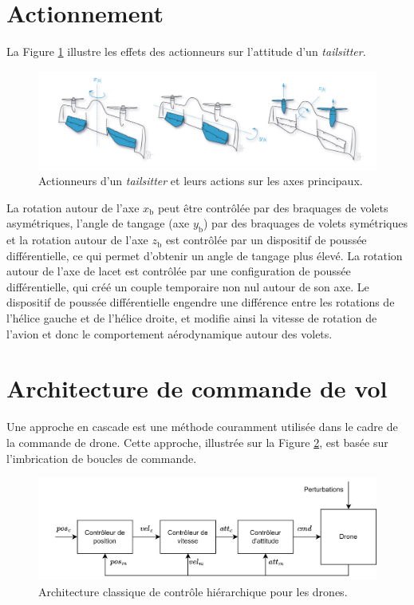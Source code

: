 \section{Actionnement}

La Figure \ref{fig:actionDarko} illustre les effets des actionneurs sur l'attitude d'un \textit{tailsitter}.
\begin{figure}[ht!]
    \centerline{
    \includegraphics[trim=0cm 0cm 0cm 0cm,clip,width=1\columnwidth]{figures/actionnement.png}}
    \caption{Actionneurs d'un \textit{tailsitter} et leurs actions sur les axes principaux.}
    \label{fig:actionDarko}
\end{figure}

La rotation autour de l'axe $x_{\text{b}}$ peut être contrôlée par des braquages de volets asymétriques, l'angle de tangage (axe $y_{\text{b}}$) par des braquages de volets symétriques et la rotation autour de l'axe $z_{\text{b}}$ est contrôlée par un dispositif de poussée différentielle, ce qui permet d'obtenir un angle de tangage plus élevé. La rotation autour de l'axe de lacet est contrôlée par une configuration de poussée différentielle, qui créé un couple temporaire non nul autour de son axe. Le dispositif de poussée différentielle engendre une différence entre les rotations de l'hélice gauche et de l'hélice droite, et modifie ainsi la vitesse de rotation de l'avion et donc le comportement aérodynamique autour des volets.


\section{Architecture de commande de vol}


Une approche en cascade est une méthode couramment utilisée dans le cadre de la commande de drone. Cette approche, illustrée sur la Figure \ref{fig:schemahiera}, est basée sur l'imbrication de boucles de  commande.

\begin{figure}[ht!]
    \centerline{
    \includegraphics[trim=0cm 0cm 0cm 0cm,clip,width=0.8\columnwidth]{figures/controlhierachique.png}}
    \caption{Architecture classique de contrôle hiérarchique pour les drones.}
    \label{fig:schemahiera}
\end{figure}

